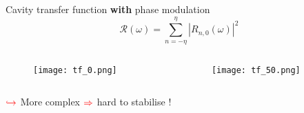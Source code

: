 \begin{frame}{Cavity transfer function \textbf{with} phase modulation}
	\begin{equation*}
		\mathcal{R}(\omega) = \sum_{n=-\eta}^\eta |R_{n,0} (\omega) |^2
	\end{equation*}
	\begin{columns}
		\begin{column}{.5\textwidth}
			\begin{figure}
				\centering
				\texttt{[image: tf\_0.png]}
			\end{figure}	
		\end{column}%
		\begin{column}{.5\textwidth}
			\begin{figure}
				\centering
				\texttt{[image: tf\_50.png]}
			\end{figure}	
		\end{column}
	\end{columns}
	\vspace{1em}
	\centering
	$\color{red} \hookrightarrow $ \alert{More complex} $\color{red} \Rightarrow$ \alert{hard to stabilise !}	
\end{frame}







